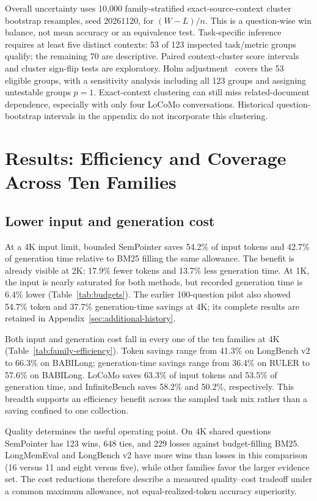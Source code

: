 \documentclass[runningheads]{llncs}
\begin{document}
Overall uncertainty uses 10,000 family-stratified exact-source-context cluster bootstrap resamples, seed 20261120, for $(W-L)/n$. This is a question-wise win balance, not mean accuracy or an equivalence test. Task-specific inference requires at least five distinct contexts: 53 of 123 inspected task/metric groups qualify; the remaining 70 are descriptive. Paired context-cluster score intervals and cluster sign-flip tests are exploratory. Holm adjustment~\cite{holm1979} covers the 53 eligible groups, with a sensitivity analysis including all 123 groups and assigning untestable groups $p=1$. Exact-context clustering can still miss related-document dependence, especially with only four LoCoMo conversations. Historical question-bootstrap intervals in the appendix do not incorporate this clustering.

\section{Results: Efficiency and Coverage Across Ten Families}
\subsection{Lower input and generation cost}

At a 4K input limit, bounded SemPointer saves 54.2\% of input tokens and 42.7\% of generation time relative to BM25 filling the same allowance. The benefit is already visible at 2K: 17.9\% fewer tokens and 13.7\% less generation time. At 1K, the input is nearly saturated for both methods, but recorded generation time is 6.4\% lower (Table~\ref{tab:budgets}). The earlier 100-question pilot also showed 54.7\% token and 37.7\% generation-time savings at 4K; its complete results are retained in Appendix~\ref{sec:additional-history}.


Both input and generation cost fall in every one of the ten families at 4K (Table~\ref{tab:family-efficiency}). Token savings range from 41.3\% on LongBench v2 to 66.3\% on BABILong; generation-time savings range from 36.4\% on RULER to 57.6\% on BABILong. LoCoMo saves 63.3\% of input tokens and 53.5\% of generation time, and InfiniteBench saves 58.2\% and 50.2\%, respectively. This breadth supports an efficiency benefit across the sampled task mix rather than a saving confined to one collection.

Quality determines the useful operating point. On 4K shared questions SemPointer has 123 wins, 648 ties, and 229 losses against budget-filling BM25. LongMemEval and LongBench v2 have more wins than losses in this comparison (16 versus 11 and eight versus five), while other families favor the larger evidence set. The cost reductions therefore describe a measured quality--cost tradeoff under a common maximum allowance, not equal-realized-token accuracy superiority.
\end{document}
